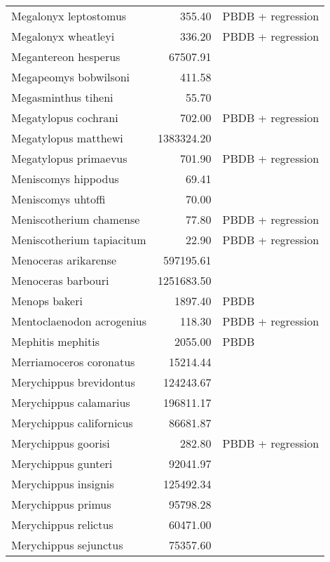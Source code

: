 \begin{table}[ht]
\begin{tabular}{lrl}
  Megalonyx leptostomus & 355.40 & PBDB + regression \\ 
  Megalonyx wheatleyi & 336.20 & PBDB + regression \\ 
  Megantereon hesperus & 67507.91 & \cite{Tomiya2013} \\ 
  Megapeomys bobwilsoni & 411.58 & \cite{Tomiya2013} \\ 
  Megasminthus tiheni & 55.70 & \cite{Tomiya2013} \\ 
  Megatylopus cochrani & 702.00 & PBDB + regression \\ 
  Megatylopus matthewi & 1383324.20 & \cite{Tomiya2013} \\ 
  Megatylopus primaevus & 701.90 & PBDB + regression \\ 
  Meniscomys hippodus & 69.41 & \cite{Tomiya2013} \\ 
  Meniscomys uhtoffi & 70.00 & \cite{McKenna2011} \\ 
  Meniscotherium chamense & 77.80 & PBDB + regression \\ 
  Meniscotherium tapiacitum & 22.90 & PBDB + regression \\ 
  Menoceras arikarense & 597195.61 & \cite{Tomiya2013} \\ 
  Menoceras barbouri & 1251683.50 & \cite{Tomiya2013} \\ 
  Menops bakeri & 1897.40 & PBDB \\ 
  Mentoclaenodon acrogenius & 118.30 & PBDB + regression \\ 
  Mephitis mephitis & 2055.00 & PBDB \\ 
  Merriamoceros coronatus & 15214.44 & \cite{Tomiya2013} \\ 
  Merychippus brevidontus & 124243.67 & \cite{Tomiya2013} \\ 
  Merychippus calamarius & 196811.17 & \cite{Tomiya2013} \\ 
  Merychippus californicus & 86681.87 & \cite{Tomiya2013} \\ 
  Merychippus goorisi & 282.80 & PBDB + regression \\ 
  Merychippus gunteri & 92041.97 & \cite{Tomiya2013} \\ 
  Merychippus insignis & 125492.34 & \cite{Tomiya2013} \\ 
  Merychippus primus & 95798.28 & \cite{Tomiya2013} \\ 
  Merychippus relictus & 60471.00 & \cite{McKenna2011} \\ 
  Merychippus sejunctus & 75357.60 & \cite{Tomiya2013} \\ 

\end{tabular}
\end{table}
